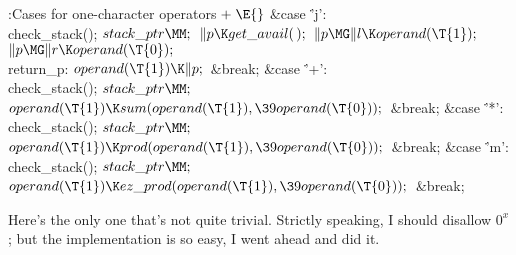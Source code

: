 \Y\B\4:Cases for one-character operators\X${}\mathrel+\E{}$\6
\4\&{case} \.{'j'}:\5
\\{check\_stack}();\6
${}\\{stack\_ptr}\MM;{}$\6
${}\|p\K\\{get\_avail}(\,);{}$\6
${}\|p\MG\|l\K\\{operand}(\T{1});{}$\6
${}\|p\MG\|r\K\\{operand}(\T{0});{}$\6
\4\\{return\_p}:\5
${}\\{operand}(\T{1})\K\|p;{}$\6
\&{break};\6
\4\&{case} \.{'+'}:\5
\\{check\_stack}();\6
${}\\{stack\_ptr}\MM;{}$\6
${}\\{operand}(\T{1})\K\\{sum}(\\{operand}(\T{1}),\39\\{operand}(\T{0}));{}$\6
\&{break};\6
\4\&{case} \.{'*'}:\5
\\{check\_stack}();\6
${}\\{stack\_ptr}\MM;{}$\6
${}\\{operand}(\T{1})\K\\{prod}(\\{operand}(\T{1}),\39\\{operand}(\T{0}));{}$\6
\&{break};\6
\4\&{case} \.{'m'}:\5
\\{check\_stack}();\6
${}\\{stack\_ptr}\MM;{}$\6
${}\\{operand}(\T{1})\K\\{ez\_prod}(\\{operand}(\T{1}),\39\\{operand}(%
\T{0}));{}$\6
\&{break};\par
\fi

Here's the only one that's not quite trivial. Strictly
speaking, I
should disallow $0^x$; but the implementation is so easy, I went ahead
and did it.

